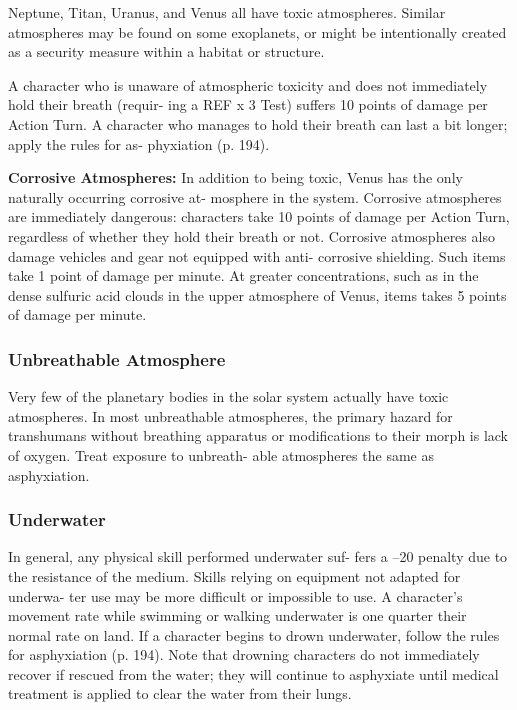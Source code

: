 Neptune, Titan, Uranus, and Venus all have toxic 
atmospheres. Similar atmospheres may be found on 
some exoplanets, or might be intentionally created as 
a security measure within a habitat or structure.

A character who is unaware of atmospheric toxicity 
and does not immediately hold their breath (requir-
ing a REF x 3 Test) suffers 10 points of damage per 
Action Turn. A character who manages to hold their 
breath can last a bit longer; apply the rules for as-
phyxiation (p. 194).

\textbf{Corrosive Atmospheres:} In addition to being toxic, 
Venus has the only naturally occurring corrosive at-
mosphere in the system. Corrosive atmospheres are 
immediately dangerous: characters take 10 points of 
damage per Action Turn, regardless of whether they 
hold their breath or not. Corrosive atmospheres also 
damage vehicles and gear not equipped with anti-
corrosive shielding. Such items take 1 point of damage 
per minute. At greater concentrations, such as in the 
dense sulfuric acid clouds in the upper atmosphere of 
Venus, items takes 5 points of damage per minute.

\subsubsection{Unbreathable Atmosphere}

Very few of the planetary bodies in the solar system 
actually have toxic atmospheres. In most unbreathable 
atmospheres, the primary hazard for transhumans 
without breathing apparatus or modifications to their 
morph is lack of oxygen. Treat exposure to unbreath-
able atmospheres the same as asphyxiation.

\subsubsection{Underwater}

In general, any physical skill performed underwater suf-
fers a –20 penalty due to the resistance of the medium. 
Skills relying on equipment not adapted for underwa-
ter use may be more difficult or impossible to use. A 
character's movement rate while swimming or walking 
underwater is one quarter their normal rate on land. 
If a character begins to drown underwater, follow the 
rules for asphyxiation (p. 194). Note that drowning 
characters do not immediately recover if rescued from 
the water; they will continue to asphyxiate until medical 
treatment is applied to clear the water from their lungs.

